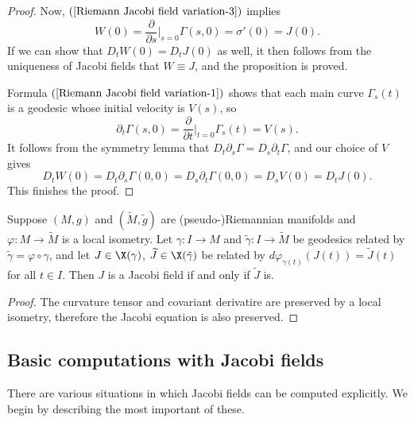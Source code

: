\begin{proof}
Now, $(\ref{Riemann Jacobi field variation-3})$ implies
\[W(0)=\frac{\partial}{\partial s}\Big|_{s=0}\Gamma(s,0)=\sigma'(0)=J(0).\]
If we can show that $D_tW(0)=D_tJ(0)$ as well, it then follows from the uniqueness of Jacobi fields that $W\equiv J$, and the proposition is proved.\par
Formula $(\ref{Riemann Jacobi field variation-1})$ shows that each main curve $\Gamma_s(t)$ is a geodesic whose initial velocity is $V(s)$, so
\[\partial_t\Gamma(s,0)=\frac{\partial}{\partial t}\Big|_{t=0}\Gamma_s(t)=V(s).\]
It follows from the symmetry lemma that $D_t\partial_s\Gamma=D_s\partial_t\Gamma$, and our choice of $V$ gives
\[D_tW(0)=D_t\partial_s\Gamma(0,0)=D_s\partial_t\Gamma(0,0)=D_sV(0)=D_tJ(0).\]
This finishes the proof.
\end{proof}
\begin{proposition}
Suppose $(M,g)$ and $(\widetilde{M},\tilde{g})$ are (pseudo-)Riemannian manifolds and $\varphi:M\to\widetilde{M}$ is a local isometry. Let $\gamma:I\to M$ 
and $\tilde{\gamma}:I\to\widetilde{M}$ be geodesics related by $\tilde{\gamma}=\varphi\circ\gamma$, and let $J\in\X(\gamma)$, $\widetilde{J}\in\X(\tilde{\gamma})$ 
be related by $d\varphi_{\gamma(t)}(J(t))=\widetilde{J}(t)$ for all $t\in I$. Then $J$ is a Jacobi field if and only if $\widetilde{J}$ is.
\end{proposition}
\begin{proof}
The curvature tensor and covariant derivatire are preserved by a local isometry, therefore the Jacobi equation is also preserved.
\end{proof}
\subsection{Basic computations with Jacobi fields}
There are various situations in which Jacobi fields can be computed explicitly. We begin by describing the most important of these.
